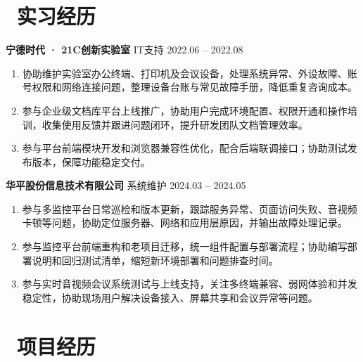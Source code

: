 \documentclass[10pt,a4paper]{ctexart}
\newcommand{\sect}[2]{%
  \section{\texorpdfstring{\makebox[\widthof{\faGraduationCap}][c]{{\mdseries\color{themecolor}#1}}\ #2}{#2}}
}
\begin{document}
\sect{\faUniversity}{实习经历}
\vspace{4pt}
\noindent\textbf{宁德时代 · 21C创新实验室} \hfill IT支持  \hfill 2022.06 -- 2022.08\\
\vspace{-7pt}
\begin{enumerate}[topsep=0pt, partopsep=1pt, itemsep=2pt, parsep=0pt]
  \item 协助维护实验室办公终端、打印机及会议设备，处理系统异常、外设故障、账号权限和网络连接问题，整理设备台账与常见故障手册，降低重复咨询成本。
  \item 参与企业级文档库平台上线推广，协助用户完成环境配置、权限开通和操作培训，收集使用反馈并跟进问题闭环，提升研发团队文档管理效率。
  \item 参与平台前端模块开发和浏览器兼容性优化，配合后端联调接口；协助测试发布版本，保障功能稳定交付。
\end{enumerate}
\vspace{4pt}
\noindent\textbf{华平股份信息技术有限公司} \hfill 系统维护 \hfill 2024.03 -- 2024.05\\
\vspace{-7pt}
\begin{enumerate}[topsep=0pt, partopsep=1pt, itemsep=2pt, parsep=0pt]
  \item 参与多监控平台日常巡检和版本更新，跟踪服务异常、页面访问失败、音视频卡顿等问题，协助定位服务器、网络和应用层原因，并输出故障处理记录。
  \item 参与监控平台前端重构和老项目迁移，统一组件配置与部署流程；协助编写部署说明和回归测试清单，缩短新环境部署和问题排查时间。
  \item 参与实时音视频会议系统测试与上线支持，关注多终端兼容、弱网体验和并发稳定性，协助现场用户解决设备接入、屏幕共享和会议异常等问题。
\end{enumerate}

\sect{\faFileText}{项目经历}
\end{document}
